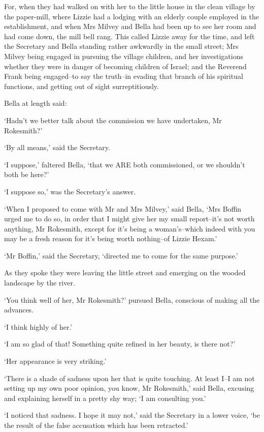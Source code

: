For, when they had walked on with her to the little house in the clean
village by the paper-mill, where Lizzie had a lodging with an elderly
couple employed in the establishment, and when Mrs Milvey and Bella
had been up to see her room and had come down, the mill bell rang.
This called Lizzie away for the time, and left the Secretary and Bella
standing rather awkwardly in the small street; Mrs Milvey being engaged
in pursuing the village children, and her investigations whether they
were in danger of becoming children of Israel; and the Reverend Frank
being engaged--to say the truth--in evading that branch of his spiritual
functions, and getting out of sight surreptitiously.

Bella at length said:

‘Hadn’t we better talk about the commission we have undertaken, Mr
Rokesmith?’

‘By all means,’ said the Secretary.

‘I suppose,’ faltered Bella, ‘that we ARE both commissioned, or we
shouldn’t both be here?’

‘I suppose so,’ was the Secretary’s answer.

‘When I proposed to come with Mr and Mrs Milvey,’ said Bella, ‘Mrs
Boffin urged me to do so, in order that I might give her my small
report--it’s not worth anything, Mr Rokesmith, except for it’s being
a woman’s--which indeed with you may be a fresh reason for it’s being
worth nothing--of Lizzie Hexam.’

‘Mr Boffin,’ said the Secretary, ‘directed me to come for the same
purpose.’

As they spoke they were leaving the little street and emerging on the
wooded landscape by the river.

‘You think well of her, Mr Rokesmith?’ pursued Bella, conscious of
making all the advances.

‘I think highly of her.’

‘I am so glad of that! Something quite refined in her beauty, is there
not?’

‘Her appearance is very striking.’

‘There is a shade of sadness upon her that is quite touching. At least
I--I am not setting up my own poor opinion, you know, Mr Rokesmith,’
said Bella, excusing and explaining herself in a pretty shy way; ‘I am
consulting you.’

‘I noticed that sadness. I hope it may not,’ said the Secretary in
a lower voice, ‘be the result of the false accusation which has been
retracted.’

